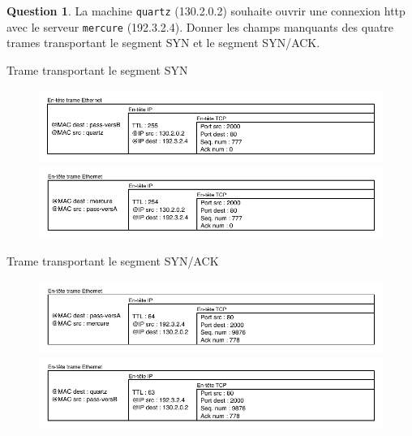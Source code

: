 \documentclass[11pt,english,french]{scrreprt}
\theoremstyle{remark}
\theoremstyle{definition}
\newtheorem{ques}{Question}[section]
\begin{document}
\begin{ques}
	La machine \lstinline!quartz! (130.2.0.2) souhaite ouvrir une connexion http avec le serveur \lstinline!mercure! (192.3.2.4). Donner les champs manquants des quatre trames transportant le segment SYN et le segment SYN/ACK.
	
	Trame transportant le segment SYN
	\begin{figure}[h]
		\center
		\includegraphics[scale=.8]{Exam2009/SYN-quartz}
		\includegraphics[scale=.8]{Exam2009/SYN-pass}
	\end{figure}
	
	Trame transportant le segment SYN/ACK
	\begin{figure}[h]
		\center
		\includegraphics[scale=.8]{Exam2009/SYNACK-mercure}
		\includegraphics[scale=.8]{Exam2009/SYNACK-pass}
	\end{figure}
\end{ques}
\end{document}
